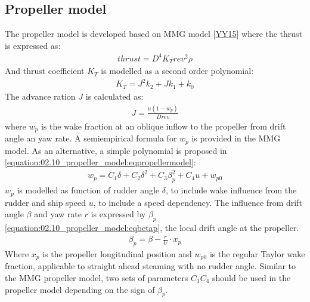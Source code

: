 \documentclass[review]{elsarticle}
\begin{document}
\subsection{Propeller model}
\label{\detokenize{02.10_propeller_model:propeller-model}}\label{\detokenize{02.10_propeller_model::doc}}
\sphinxAtStartPar
The propeller model is developed based on MMG model {[}\hyperlink{cite.bibligraphy:id22}{YY15}{]} where the thrust is expressed as:
\begin{equation}\label{equation:02.10_propeller_model:eqT}
\begin{split}\displaystyle thrust = D^{4} K_{T} rev^{2} \rho\end{split}
\end{equation}
\sphinxAtStartPar
And thrust coefficient \(K_T\) is modelled as a second order polynomial:
\begin{equation}\label{equation:02.10_propeller_model:eqkt}
\begin{split}\displaystyle K_{T} = J^{2} k_{2} + J k_{1} + k_{0}\end{split}
\end{equation}
\sphinxAtStartPar
The advance ration \(J\) is calculated as:
\begin{equation}\label{equation:02.10_propeller_model:eqJ}
\begin{split}\displaystyle J = \frac{u \left(1 - w_{p}\right)}{D rev}\end{split}
\end{equation}
\sphinxAtStartPar
where \(w_p\) is the wake fraction at an oblique inflow to the propeller from drift angle an yaw rate. A semiempirical formula for \(w_p\) is provided in the MMG model. As an alternative, a simple polynomial is proposed in \autoref{equation:02.10_propeller_model:eqpropellermodel}:
\begin{equation}\label{equation:02.10_propeller_model:eqpropellermodel}
\begin{split}\displaystyle w_{p} = C_{1} \delta + C_{2} \delta^{2} + C_{3} \beta_{p}^{2} + C_{4} u + w_{p0}\end{split}
\end{equation}
\sphinxAtStartPar
\(w_p\) is modelled as function of rudder angle \(\delta\), to include wake influence from the rudder and ship speed \(u\), to include a speed dependency. The influence from drift angle \(\beta\) and yaw rate \(r\) is expressed by \(\beta_p\) \autoref{equation:02.10_propeller_model:eqbetap}, the local drift angle at the propeller.
\begin{equation}\label{equation:02.10_propeller_model:eqbetap}
\begin{split}\beta_p=\beta - \frac{r}{U} \cdot x_p \end{split}
\end{equation}
\sphinxAtStartPar
Where \(x_p\) is the propeller longitudinal position and \(w_{p0}\) is the regular Taylor wake fraction, applicable to straight ahead steaming with no rudder angle. Similar to the MMG propeller model, two sets of parameters \(C_1\)\sphinxhyphen{}\(C_4\) should be used in the propeller model depending on the sign of \(\beta_p\).
\end{document}
